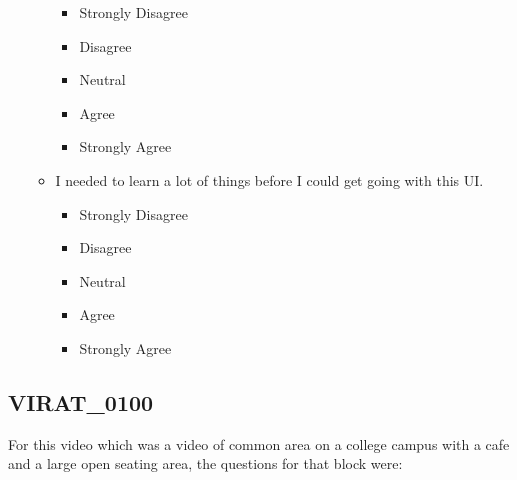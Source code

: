 \documentclass[doublespace,draft,nopageskip]{VTthesis} %
\begin{document}
\begin{itemize}
\begin{itemize}
            \begin{itemize}
                \item Strongly Disagree
                \item Disagree
                \item Neutral
                \item Agree
                \item Strongly Agree
            \end{itemize}
        \item I needed to learn a lot of things before I could get going with this UI.
            \begin{itemize}
                \item Strongly Disagree
                \item Disagree
                \item Neutral
                \item Agree
                \item Strongly Agree
            \end{itemize}
    \end{itemize}
\end{itemize}

\subsection{VIRAT_0100}

For this video which was a video of common area on a college campus with a cafe and a large open seating area, the questions for that block were: 
\end{document}
